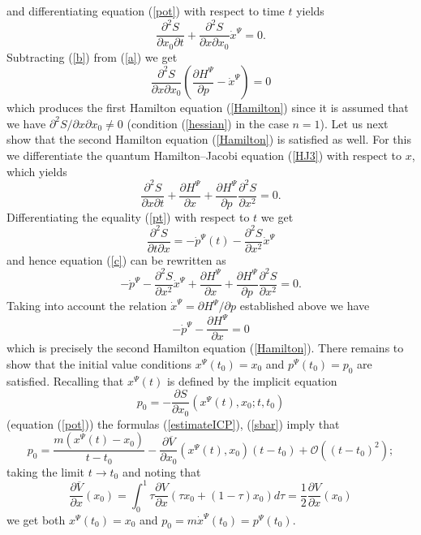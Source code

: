 \documentclass[12pt]{article}%
\begin{document}
and differentiating equation (\ref{pot}) with respect to time $t$ yields%
\begin{equation}
\frac{\partial^{2}S}{\partial x_{0}\partial t}+\frac{\partial^{2}S}{\partial
x\partial x_{0}}\dot{x}^{\Psi}=0. \label{b}%
\end{equation}
Subtracting (\ref{b}) from (\ref{a}) we get%
\[
\frac{\partial^{2}S}{\partial x\partial x_{0}}\left(  \frac{\partial H^{\Psi}%
}{\partial p}-\dot{x}^{\Psi}\right)  =0
\]
which produces the first Hamilton equation (\ref{Hamilton}) since it is
assumed that we have $\partial^{2}S/\partial x\partial x_{0}\neq0$ (condition
(\ref{hessian}) in the case $n=1$). Let us next show that the second Hamilton
equation (\ref{Hamilton}) is satisfied as well. For this we differentiate the
quantum Hamilton--Jacobi equation (\ref{HJ3}) with respect to $x$, which
yields%
\begin{equation}
\frac{\partial^{2}S}{\partial x\partial t}+\frac{\partial H^{\Psi}}{\partial
x}+\frac{\partial H^{\Psi}}{\partial p}\frac{\partial^{2}S}{\partial x^{2}}=0.
\label{c}%
\end{equation}
Differentiating the equality (\ref{pt}) with respect to $t$ we get%
\begin{equation}
\frac{\partial^{2}S}{\partial t\partial x}=-\dot{p}^{\Psi}(t)-\frac
{\partial^{2}S}{\partial x^{2}}\dot{x}^{\Psi} \label{d}%
\end{equation}
and hence equation (\ref{c}) can be rewritten as%
\[
-\dot{p}^{\Psi}-\frac{\partial^{2}S}{\partial x^{2}}\dot{x}^{\Psi}%
+\frac{\partial H^{\Psi}}{\partial x}+\frac{\partial H^{\Psi}}{\partial
p}\frac{\partial^{2}S}{\partial x^{2}}=0.
\]
Taking into account the relation $\dot{x}^{\Psi}=\partial H^{\Psi}/\partial p$
established above we have
\[
-\dot{p}^{\Psi}-\frac{\partial H^{\Psi}}{\partial x}=0
\]
which is precisely the second Hamilton equation (\ref{Hamilton}). There
remains to show that the initial value conditions $x^{\Psi}(t_{0})=x_{0}$ and
$p^{\Psi}(t_{0})=p_{0}$ are satisfied. Recalling that $x^{\Psi}(t)$ is defined
by the implicit equation
\[
p_{0}=-\frac{\partial S}{\partial x_{0}}(x^{\Psi}(t),x_{0};t,t_{0})
\]
(equation (\ref{pot})) the formulas (\ref{estimateICP}), (\ref{sbar}) imply
that%
\[
p_{0}=\frac{m(x^{\Psi}(t)-x_{0})}{t-t_{0}}-\frac{\partial\overline{V}%
}{\partial x_{0}}(x^{\Psi}(t),x_{0})(t-t_{0})+\mathcal{O}((t-t_{0})^{2});
\]
taking the limit $t\rightarrow t_{0}$ and noting that
\begin{equation}
\frac{\partial\overline{V}}{\partial x}(x_{0})=\int_{0}^{1}\tau\frac{\partial
V}{\partial x}(\tau x_{0}+(1-\tau)x_{0})d\tau=\frac{1}{2}\frac{\partial
V}{\partial x}(x_{0}) \label{limto}%
\end{equation}
we get both $x^{\Psi}(t_{0})=x_{0}$ and $p_{0}=m\dot{x}^{\Psi}(t_{0})=p^{\Psi
}(t_{0})$.
\end{document}
